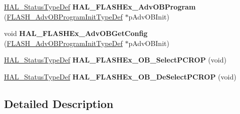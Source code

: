 \begin{DoxyCompactItemize}
\item 
\hyperlink{stm32f4xx__hal__def_8h_a63c0679d1cb8b8c684fbb0632743478f}{H\+A\+L\+\_\+\+Status\+Type\+Def} {\bfseries H\+A\+L\+\_\+\+F\+L\+A\+S\+H\+Ex\+\_\+\+Adv\+O\+B\+Program} (\hyperlink{struct_f_l_a_s_h___adv_o_b_program_init_type_def}{F\+L\+A\+S\+H\+\_\+\+Adv\+O\+B\+Program\+Init\+Type\+Def} $\ast$p\+Adv\+O\+B\+Init)\hypertarget{group___f_l_a_s_h_ex___exported___functions___group1_gaf5556c723d5dc6ab06ebd6faf54c6c03}{}\label{group___f_l_a_s_h_ex___exported___functions___group1_gaf5556c723d5dc6ab06ebd6faf54c6c03}

\item 
void {\bfseries H\+A\+L\+\_\+\+F\+L\+A\+S\+H\+Ex\+\_\+\+Adv\+O\+B\+Get\+Config} (\hyperlink{struct_f_l_a_s_h___adv_o_b_program_init_type_def}{F\+L\+A\+S\+H\+\_\+\+Adv\+O\+B\+Program\+Init\+Type\+Def} $\ast$p\+Adv\+O\+B\+Init)\hypertarget{group___f_l_a_s_h_ex___exported___functions___group1_ga5f79b74133fef058a72eae9c9eea4d36}{}\label{group___f_l_a_s_h_ex___exported___functions___group1_ga5f79b74133fef058a72eae9c9eea4d36}

\item 
\hyperlink{stm32f4xx__hal__def_8h_a63c0679d1cb8b8c684fbb0632743478f}{H\+A\+L\+\_\+\+Status\+Type\+Def} {\bfseries H\+A\+L\+\_\+\+F\+L\+A\+S\+H\+Ex\+\_\+\+O\+B\+\_\+\+Select\+P\+C\+R\+OP} (void)\hypertarget{group___f_l_a_s_h_ex___exported___functions___group1_ga78992850d1e2e36ec7f01c1063320499}{}\label{group___f_l_a_s_h_ex___exported___functions___group1_ga78992850d1e2e36ec7f01c1063320499}

\item 
\hyperlink{stm32f4xx__hal__def_8h_a63c0679d1cb8b8c684fbb0632743478f}{H\+A\+L\+\_\+\+Status\+Type\+Def} {\bfseries H\+A\+L\+\_\+\+F\+L\+A\+S\+H\+Ex\+\_\+\+O\+B\+\_\+\+De\+Select\+P\+C\+R\+OP} (void)\hypertarget{group___f_l_a_s_h_ex___exported___functions___group1_gab642acc010e4d32e293d7c6faa70b0a3}{}\label{group___f_l_a_s_h_ex___exported___functions___group1_gab642acc010e4d32e293d7c6faa70b0a3}

\end{DoxyCompactItemize}


\subsection{Detailed Description}

